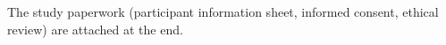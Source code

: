 \documentclass[conference]{IEEEtran}
\begin{document}



\appendix

The study paperwork (participant information sheet, informed consent, ethical review) are attached at the end.






\onecolumn



\end{document}
